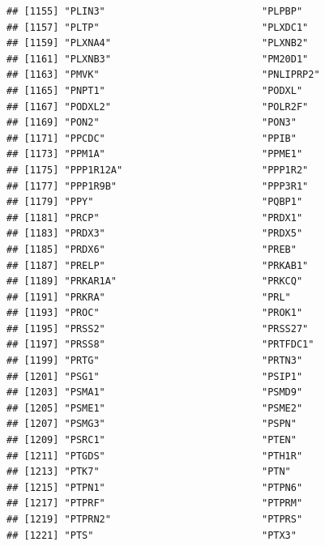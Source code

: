\documentclass[
]{article}
\begin{document}
\begin{verbatim}
## [1155] "PLIN3"                           "PLPBP"                          
## [1157] "PLTP"                            "PLXDC1"                         
## [1159] "PLXNA4"                          "PLXNB2"                         
## [1161] "PLXNB3"                          "PM20D1"                         
## [1163] "PMVK"                            "PNLIPRP2"                       
## [1165] "PNPT1"                           "PODXL"                          
## [1167] "PODXL2"                          "POLR2F"                         
## [1169] "PON2"                            "PON3"                           
## [1171] "PPCDC"                           "PPIB"                           
## [1173] "PPM1A"                           "PPME1"                          
## [1175] "PPP1R12A"                        "PPP1R2"                         
## [1177] "PPP1R9B"                         "PPP3R1"                         
## [1179] "PPY"                             "PQBP1"                          
## [1181] "PRCP"                            "PRDX1"                          
## [1183] "PRDX3"                           "PRDX5"                          
## [1185] "PRDX6"                           "PREB"                           
## [1187] "PRELP"                           "PRKAB1"                         
## [1189] "PRKAR1A"                         "PRKCQ"                          
## [1191] "PRKRA"                           "PRL"                            
## [1193] "PROC"                            "PROK1"                          
## [1195] "PRSS2"                           "PRSS27"                         
## [1197] "PRSS8"                           "PRTFDC1"                        
## [1199] "PRTG"                            "PRTN3"                          
## [1201] "PSG1"                            "PSIP1"                          
## [1203] "PSMA1"                           "PSMD9"                          
## [1205] "PSME1"                           "PSME2"                          
## [1207] "PSMG3"                           "PSPN"                           
## [1209] "PSRC1"                           "PTEN"                           
## [1211] "PTGDS"                           "PTH1R"                          
## [1213] "PTK7"                            "PTN"                            
## [1215] "PTPN1"                           "PTPN6"                          
## [1217] "PTPRF"                           "PTPRM"                          
## [1219] "PTPRN2"                          "PTPRS"                          
## [1221] "PTS"                             "PTX3"                           

\end{verbatim}
\end{document}
